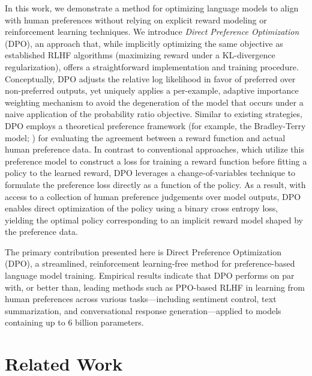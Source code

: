 In this work, we demonstrate a method for optimizing language models to align with human preferences without relying on explicit reward modeling or reinforcement learning techniques. We introduce \textit{Direct Preference Optimization} (DPO), an approach that, while implicitly optimizing the same objective as established RLHF algorithms (maximizing reward under a KL-divergence regularization), offers a straightforward implementation and training procedure. Conceptually, DPO adjusts the relative log likelihood in favor of preferred over non-preferred outputs, yet uniquely applies a per-example, adaptive importance weighting mechanism to avoid the degeneration of the model that occurs under a naive application of the probability ratio objective. Similar to existing strategies, DPO employs a theoretical preference framework (for example, the Bradley-Terry model; \cite{bradley1952rankanalysis}) for evaluating the agreement between a reward function and actual human preference data. In contrast to conventional approaches, which utilize this preference model to construct a loss for training a reward function before fitting a policy to the learned reward, DPO leverages a change-of-variables technique to formulate the preference loss directly as a function of the policy. As a result, with access to a collection of human preference judgements over model outputs, DPO enables direct optimization of the policy using a binary cross entropy loss, yielding the optimal policy corresponding to an implicit reward model shaped by the preference data.

The primary contribution presented here is Direct Preference Optimization (DPO), a streamlined, reinforcement learning-free method for preference-based language model training. Empirical results indicate that DPO performs on par with, or better than, leading methods such as PPO-based RLHF in learning from human preferences across various tasks—including sentiment control, text summarization, and conversational response generation—applied to models containing up to 6 billion parameters.

\section{Related Work}

